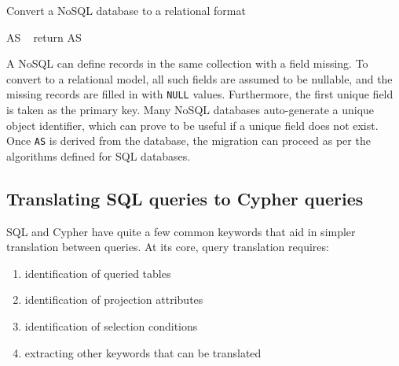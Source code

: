 \documentclass[12pt]{article}
\begin{document}
    \begin{algorithm}[htb!]
        \SetAlgoLined
        \caption{Convert a NoSQL database to a relational format}
        AS \gets\ \phi{}
        return AS\;
        \label{algo:nosql_conversion}
    \end{algorithm}

    A NoSQL can define records in the same collection with a field missing. To convert to a relational model, all such fields are assumed to be nullable, and the missing records are filled in with \verb|NULL| values. Furthermore, the first unique field is taken as the primary key. Many NoSQL databases auto-generate a unique object identifier, which can prove to be useful if a unique field does not exist. Once \verb|AS| is derived from the database, the migration can proceed as per the algorithms defined for SQL databases.

    \subsection{Translating SQL queries to Cypher queries}
    \label{sec:meth_query}
    SQL and Cypher have quite a few common keywords that aid in simpler translation between queries. At its core, query translation requires:
    \begin{enumerate}
        \item identification of queried tables
        \item identification of projection attributes
        \item identification of selection conditions
        \item extracting other keywords that can be translated
    \end{enumerate}
\end{document}
